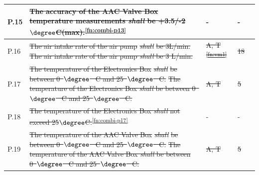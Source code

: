 \documentclass[a4paper,12pt,twoside]{article}
\providecommand{\DIFaddtex}[1]{{\protect\color{blue}\uwave{#1}}} %
\providecommand{\DIFdeltex}[1]{{\protect\color{red}\sout{#1}}}                      %
\providecommand{\DIFaddbegin}{} %
\providecommand{\DIFaddend}{} %
\providecommand{\DIFdelbegin}{} %
\providecommand{\DIFdelend}{} %
\providecommand{\DIFadd}[1]{\texorpdfstring{\DIFaddtex{#1}}{#1}} %
\providecommand{\DIFdel}[1]{\texorpdfstring{\DIFdeltex{#1}}{}} %
\newcommand{\DIFscaledelfig}{0.5}
\newlength{\DIFdelgraphicswidth} %
\newlength{\DIFdelgraphicsheight} %
\newcommand{\DIFaddincludegraphics}[2][]{{\color{blue}\fbox{\DIFOincludegraphics[#1]{#2}}}} %
\newcommand{\DIFdelincludegraphics}[2][]{%
\sbox{\DIFdelgraphicsbox}{\DIFOincludegraphics[#1]{#2}}%
\settoboxwidth{\DIFdelgraphicswidth}{\DIFdelgraphicsbox} %
\settoboxtotalheight{\DIFdelgraphicsheight}{\DIFdelgraphicsbox} %
\scalebox{\DIFscaledelfig}{%
\parbox[b]{\DIFdelgraphicswidth}{\usebox{\DIFdelgraphicsbox}\\[-\baselineskip] \rule{\DIFdelgraphicswidth}{0em}}\llap{\resizebox{\DIFdelgraphicswidth}{\DIFdelgraphicsheight}{%
\setlength{\unitlength}{\DIFdelgraphicswidth}%
\begin{picture}(1,1)%
\thicklines\linethickness{2pt} %
{\color[rgb]{1,0,0}\put(0,0){\framebox(1,1){}}}%
{\color[rgb]{1,0,0}\put(0,0){\line( 1,1){1}}}%
{\color[rgb]{1,0,0}\put(0,1){\line(1,-1){1}}}%
\end{picture}%
}\hspace*{3pt}}} %
} %
\DeclareRobustCommand{\DIFaddbegin}{\DIFOaddbegin \let\includegraphics\DIFaddincludegraphics} %
\DeclareRobustCommand{\DIFaddend}{\DIFOaddend \let\includegraphics\DIFOincludegraphics} %
\DeclareRobustCommand{\DIFdelbegin}{\DIFOdelbegin \let\includegraphics\DIFdelincludegraphics} %
\DeclareRobustCommand{\DIFdelend}{\DIFOaddend \let\includegraphics\DIFOincludegraphics} %
\begin{document}
\begin{longtable}[]{|m{}| m{} |m{} |m{}|m{}|}
P.15 & \st{The accuracy of the AAC Valve Box temperature measurements \textit{shall} be +3.5/-2$\degree$C(max).}\textsuperscript{\ref{fn:combi-p13}}   & - &- & \DIFaddbegin \DIFadd{- }\DIFaddend \\ \hline
P.16 & \DIFdelbegin \DIFdel{The air intake rate of the air pump }\textit{\DIFdel{shall}} %
\DIFdel{be 3L/min.                                                                                                                       }\DIFdelend \DIFaddbegin \st{The air intake rate of the air pump \textit{shall} be 3 L/min.} \DIFadd{\textsuperscript{\ref{designRequirement}}   }\DIFaddend & \DIFdelbegin \DIFdel{A, T \textsuperscript{\ref{fn:vm1}}       }\DIFdelend \DIFaddbegin \DIFadd{- }\DIFaddend &\DIFdelbegin \DIFdel{18            }\DIFdelend \DIFaddbegin \DIFadd{- }\DIFaddend & \DIFaddbegin \DIFadd{- }\DIFaddend \\ \hline
P.17 & \DIFdelbegin \DIFdel{The temperature of the Electronics Box }\textit{\DIFdel{shall}} %
\DIFdel{be between 0\mbox{%
$\degree$
}%
C and 25\mbox{%
$\degree$
}%
C.                                                                                                   }\DIFdelend \DIFaddbegin \st{The temperature of the Electronics Box \textit{shall} be between 0\mbox{%
$\degree$
}%
C and 25\mbox{%
$\degree$
}%
C.} \DIFadd{\textsuperscript{\ref{designRequirement}}   }\DIFaddend & \DIFdelbegin \DIFdel{A, T       }\DIFdelend \DIFaddbegin \DIFadd{- }\DIFaddend &\DIFdelbegin \DIFdel{5           }\DIFdelend \DIFaddbegin \DIFadd{- }\DIFaddend & \DIFaddbegin \DIFadd{- }\DIFaddend \\ \hline
P.18 & \st{The temperature of the Electronics Box \textit{shall} not exceed 25$\degree$C.}\textsuperscript{\ref{fn:combi-p17}}   & - &- & \DIFaddbegin \DIFadd{- }\DIFaddend \\ \hline
P.19 & \DIFdelbegin \DIFdel{The temperature of the AAC Valve Box }\textit{\DIFdel{shall}} %
\DIFdel{be between 0\mbox{%
$\degree$
}%
C and 25\mbox{%
$\degree$
}%
C.                                                                                                    }\DIFdelend \DIFaddbegin \st{The temperature of the AAC Valve Box \textit{shall} be between 0\mbox{%
$\degree$
}%
C and 25\mbox{%
$\degree$
}%
C.}\DIFadd{\textsuperscript{\ref{designRequirement}}   }\DIFaddend & \DIFdelbegin \DIFdel{A, T       }\DIFdelend \DIFaddbegin \DIFadd{- }\DIFaddend &\DIFdelbegin \DIFdel{5            }\DIFdelend \DIFaddbegin \DIFadd{- }\DIFaddend & \DIFaddbegin \DIFadd{- }\DIFaddend \\ \hline

\end{longtable}
\end{document}
